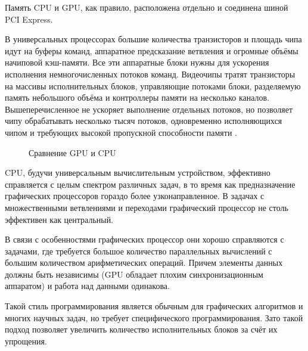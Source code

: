 \documentclass[a4paper,14pt,russian]{extreport}
\begin{document}
\par Память CPU и GPU, как правило, расположена отдельно и соединена шиной PCI Express. 
\par В универсальных процессорах большие количества транзисторов и площадь чипа идут на буферы команд, аппаратное предсказание ветвления и огромные объёмы начиповой кэш-памяти. Все эти аппаратные блоки нужны для ускорения исполнения немногочисленных потоков команд. Видеочипы тратят транзисторы на массивы исполнительных блоков, управляющие потоками блоки, разделяемую память небольшого объёма и контроллеры памяти на несколько каналов. Вышеперечисленное не ускоряет выполнение отдельных потоков, но позволяет чипу обрабатывать несколько тысяч потоков, одновременно исполняющихся чипом и требующих высокой пропускной способности памяти \cite{poletaev}.
\par
  \begin{figure}[h]
  \caption{Сравнение GPU и CPU}
  \label{ris:compare}
  \end{figure}
\par CPU, будучи универсальным вычислительным устройством, эффективно справляется с целым спектром различных задач, в то время как предназначение графических процессоров гораздо более узконаправленное. В задачах с множественными ветвлениями и переходами графический процессор не столь эффективен как центральный.
\par В связи с особенностями графических процессор они хорошо справляются с задачами, где требуется большое количество параллельных вычислений с большим количеством арифметических операций. Причем элементы данных должны быть независимы (GPU обладает плохим синхронизационным аппаратом) и работа над данными одинакова. 
\par Такой стиль программирования является обычным для графических алгоритмов и многих научных задач, но требует специфического программирования. Зато такой подход позволяет увеличить количество исполнительных блоков за счёт их упрощения.
\end{document}
